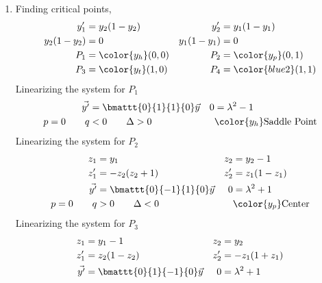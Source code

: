\begin{enumerate}
    \item Finding critical points,
          \begin{align}
              y_1'         & = y_2(1 - y_2)         &
              y_2'         & = y_1(1 - y_1)           \\
              y_2(1 - y_2) & = 0                    &
              y_1(1 - y_1) & = 0                      \\
              P_1          & = \color{y_h}(0, 0)    &
              P_2          & = \color{y_p} (0, 1)     \\
              P_3          & = \color{y_t} (1, 0)   &
              P_4          & = \color{blue2} (1, 1)
          \end{align}
          Linearizing the system for $ P_1 $
          \begin{align}
              \vec{y'}       & = \bmattt{0}{1}{1}{0} \vec{y}   &
              0              & = \lambda^{2} - 1                 \\
              p = 0 \qquad q & < 0 \qquad \Delta > 0           &
                             & \color{y_h} \text{Saddle Point}
          \end{align}
          Linearizing the system for $ P_2 $
          \begin{align}
              z_1            & = y_1                          &
              z_2            & = y_2 - 1                        \\
              z_1'           & =  -z_2(z_2 + 1)               &
              z_2'           & = z_1(1 - z_1)                   \\
              \vec{y'}       & = \bmattt{0}{-1}{1}{0} \vec{y} &
              0              & = \lambda^{2} + 1                \\
              p = 0 \qquad q & > 0 \qquad \Delta < 0          &
                             & \color{y_p} \text{Center}
          \end{align}
          Linearizing the system for $ P_3 $
          \begin{align}
              z_1            & = y_1 - 1                      &
              z_2            & = y_2                            \\
              z_1'           & =  z_2(1 - z_2)                &
              z_2'           & = -z_1(1 + z_1)                  \\
              \vec{y'}       & = \bmattt{0}{1}{-1}{0} \vec{y} &
              0              & = \lambda^{2} + 1                \\

\end{align}
\end{enumerate}
